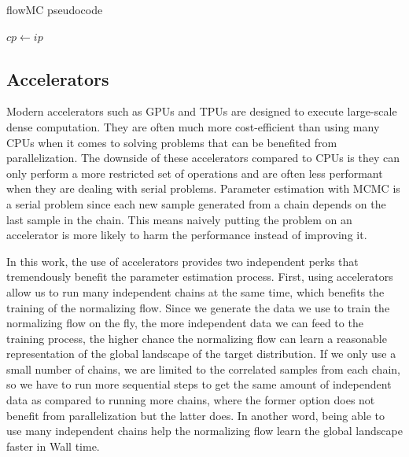 \documentclass[twocolumn]{aastex631}
\begin{document}
\begin{algorithm}
\caption{flowMC pseudocode}\label{alg:cap}
$cp \leftarrow ip$\\

\end{algorithm}

\subsection{Accelerators}
\label{sec:accelerators}

Modern accelerators such as GPUs and TPUs are designed to execute large-scale
dense computation. They are often much more cost-efficient than using many CPUs
when it comes to solving problems that can be benefited from parallelization.
The downside of these accelerators compared to CPUs is they can only perform a
more restricted set of operations and are often less performant when they are
dealing with serial problems. Parameter estimation with MCMC is a serial
problem since each new sample generated from a chain depends on the last sample
in the chain. This means naively putting the problem on an accelerator is more
likely to harm the performance instead of improving it.


In this work, the use of accelerators provides two independent perks that
tremendously benefit the parameter estimation process. First, using
accelerators allow us to run many independent chains at the same time, which
benefits the training of the normalizing flow. Since we generate the data we use
to train the normalizing flow on the fly, the more independent data we can feed
to the training process, the higher chance the normalizing flow can learn a
reasonable representation of the global landscape of the target distribution. If
we only use a small number of chains, we are limited to the correlated samples
from each chain, so we have to run more sequential steps to get the same amount
of independent data as compared to running more chains, where the former option does
not benefit from parallelization but the latter does. In another word, being
able to use many independent chains help the normalizing flow learn the global
landscape faster in Wall time.
\end{document}
